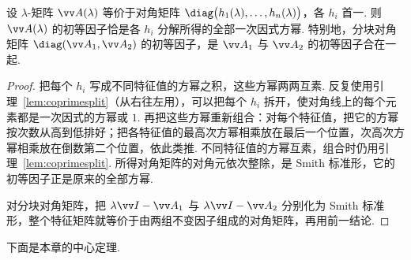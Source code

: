 	\begin{proposition}\label{prop:blockelemdiv}
		设 $\lambda$-矩阵 $\vv A(\lambda)$ 等价于对角矩阵 $\diag\big(h_1(\lambda),\ldots,h_n(\lambda)\big)$，各 $h_i$ 首一. 则 $\vv A(\lambda)$ 的初等因子恰是各 $h_i$ 分解所得的全部一次因式方幂. 特别地，分块对角矩阵 $\diag(\vv A_1,\vv A_2)$ 的初等因子，是 $\vv A_1$ 与 $\vv A_2$ 的初等因子合在一起.
	\end{proposition}
	\begin{proof}
		把每个 $h_i$ 写成不同特征值的方幂之积，这些方幂两两互素. 反复使用引理~\ref{lem:coprimesplit}（从右往左用），可以把每个 $h_i$ 拆开，使对角线上的每个元素都是一次因式的方幂或 $1$. 再把这些方幂重新组合：对每个特征值，把它的方幂按次数从高到低排好；把各特征值的最高次方幂相乘放在最后一个位置，次高次方幂相乘放在倒数第二个位置，依此类推. 不同特征值的方幂互素，组合时仍用引理~\ref{lem:coprimesplit}. 所得对角矩阵的对角元依次整除，是 Smith 标准形，它的初等因子正是原来的全部方幂.
		
		对分块对角矩阵，把 $\lambda\vv I-\vv A_1$ 与 $\lambda\vv I-\vv A_2$ 分别化为 Smith 标准形，整个特征矩阵就等价于由两组不变因子组成的对角矩阵，再用前一结论.
	\end{proof}
	
	下面是本章的中心定理.
	
